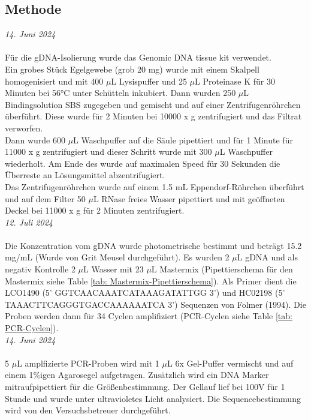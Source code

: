 \documentclass[oneside,10pt,a4paper]{report}
\begin{document}
	\subsection{Methode}
	\textit{14. Juni 2024}\\
	\\
	Für die gDNA-Isolierung wurde das Genomic DNA tissue kit verwendet.\\
	Ein grobes Stück Egelgewebe (grob 20 mg) wurde mit einem Skalpell homogenisiert und mit 400 $\mu$L Lysispuffer und 25 $\mu$L Proteinase K für 30 Minuten bei 56°C unter Schütteln inkubiert. Dann wurden 250 $\mu$L Bindingsolution SBS zugegeben und gemischt und auf einer Zentrifugenröhrchen überführt. Diese wurde für 2 Minuten bei 10000 x g zentrifugiert und das Filtrat verworfen.\\
	Dann wurde 600 $\mu$L Waschpuffer auf die Säule pipettiert und für 1 Minute für 11000 x g zentrifugiert und dieser Schritt wurde mit 300 $\mu$L Waschpuffer wiederholt. Am Ende des wurde auf maximalen Speed für 30 Sekunden die Überreste an Lösungsmittel abzentrifugiert.\\
	Das Zentrifugenröhrchen wurde auf einem 1.5 mL Eppendorf-Röhrchen überführt und auf dem Filter 50 $\mu$L RNase freies Wasser pipettiert und mit geöffneten Deckel bei 11000 x g für 2 Minuten zentrifugiert.
	\\
	\textit{12. Juli 2024}\\
	\\
	Die Konzentration vom gDNA wurde photometrische bestimmt und beträgt 15.2 mg/mL (Wurde von Grit Meusel durchgeführt).
	Es wurden 2 $\mu$L gDNA und als negativ Kontrolle 2 $\mu$L Wasser mit 23 $\mu$L Mastermix (Pipettierschema für den Mastermix siehe Table \ref{tab: Mastermix-Pipettierschema}).
	Als Primer dient die LCO1490 (5’ GGTCAACAAATCATAAAGATATTGG 3') und HC02198 (5’ TAAACTTCAGGGTGACCAAAAAATCA 3’) Sequenzen von Folmer (1994).
	Die Proben werden dann für 34 Cyclen amplifiziert (PCR-Cyclen siehe Table \ref{tab: PCR-Cyclen}).
	\\
	\textit{14. Juni 2024}\\
	\\
	5 $\mu$L amplfizierte PCR-Proben wird mit 1 $\mu$L 6x Gel-Puffer vermischt und auf einem 1$\%$igen Agarosegel aufgetragen. Zusätzlich wird ein DNA Marker mitraufpipettiert für die Größenbestimmung.
	Der Gellauf lief bei 100V für 1 Stunde und wurde unter ultravioletes Licht analysiert. Die Sequencebestimmung wird von den Versuchsbetreuer durchgeführt.
	
\end{document}
